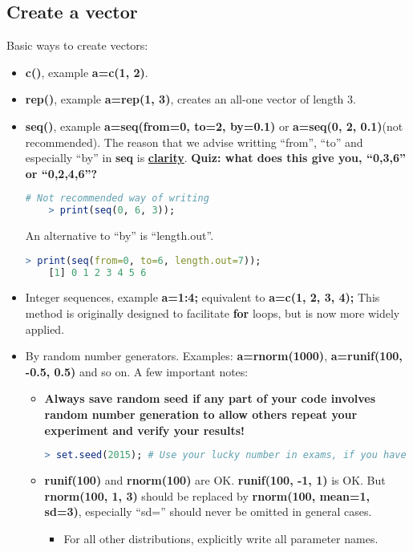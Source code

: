 \documentclass[10pt]{article}
\begin{document}
\subsection{Create a vector}
Basic ways to create vectors:
\begin{itemize}
	\item {\bf c()}, example {\bf a=c(1, 2)}.
	\item {\bf rep()}, example {\bf a=rep(1, 3)}, creates an all-one vector of length $3$.
	\item {\bf seq()}, example {\bf a=seq(from=0, to=2, by=0.1)} or {\bf a=seq(0, 2, 0.1)}(not recommended).
	The reason that we advise writting ``from'', ``to'' and especially ``by'' in {\bf seq} is \underline{\bf clarity}.
	{\bf Quiz: what does this give you, ``0,3,6'' or ``0,2,4,6''?}
	\begin{lstlisting}[style=displaycode, language=R]
	# Not recommended way of writing
	> print(seq(0, 6, 3));
	\end{lstlisting}
	An alternative to ``by'' is ``length.out''.
	\begin{lstlisting}[style=displaycode, language=R]
	> print(seq(from=0, to=6, length.out=7));
	[1] 0 1 2 3 4 5 6
	\end{lstlisting}
	\item Integer sequences, example {\bf a=1:4;} equivalent to {\bf a=c(1, 2, 3, 4);} This method is originally designed to facilitate {\bf for} loops, but is now more widely applied.
	\item By random number generators. Examples: {\bf a=rnorm(1000)}, {\bf a=runif(100, -0.5, 0.5)} and so on. A few important notes:
	\begin{itemize}
		\item {\bf Always save random seed if any part of your code involves random number generation to allow others repeat your experiment and verify your results!}
\begin{lstlisting}[style=displaycode, language=R]
	> set.seed(2015); # Use your lucky number in exams, if you have one.
\end{lstlisting}
		\item {\bf runif(100)} and {\bf rnorm(100)} are OK. {\bf runif(100, -1, 1)} is OK. But {\bf rnorm(100, 1, 3)} should be replaced by {\bf rnorm(100, mean=1, sd=3)}, especially ``sd='' should never be omitted in general cases.
		\begin{itemize}
			\item For all other distributions, explicitly write all parameter names.
		\end{itemize}
	\end{itemize}
\end{itemize}
\end{document}
